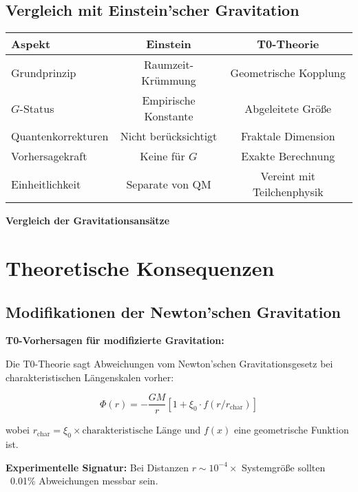 \documentclass[12pt,a4paper]{article}
\begin{document}
	\subsection{Vergleich mit Einstein'scher Gravitation}
	
	\begin{center}
		\begin{tabular}{lcc}
			\toprule
			\textbf{Aspekt} & \textbf{Einstein} & \textbf{T0-Theorie} \\
			\midrule
			Grundprinzip & Raumzeit-Krümmung & Geometrische Kopplung \\
			$G$-Status & Empirische Konstante & Abgeleitete Größe \\
			Quantenkorrekturen & Nicht berücksichtigt & Fraktale Dimension \\
			Vorhersagekraft & Keine für $G$ & Exakte Berechnung \\
			Einheitlichkeit & Separate von QM & Vereint mit Teilchenphysik \\
			\bottomrule
		\end{tabular}
		\par\vspace{0.5em}
		\textbf{Vergleich der Gravitationsansätze}
	\end{center}
	
	\section{Theoretische Konsequenzen}
	
	\subsection{Modifikationen der Newton'schen Gravitation}
	
	\begin{warning}
		\textbf{T0-Vorhersagen für modifizierte Gravitation:}
		
		Die T0-Theorie sagt Abweichungen vom Newton'schen Gravitationsgesetz bei charakteristischen Längenskalen vorher:
		
		\begin{equation}
			\Phi(r) = -\frac{GM}{r} \left[1 + \xi_0 \cdot f(r/r_{\text{char}})\right]
		\end{equation}
		
		wobei $r_{\text{char}} = \xi_0 \times \text{charakteristische Länge}$ und $f(x)$ eine geometrische Funktion ist.
		
		\textbf{Experimentelle Signatur:} Bei Distanzen $r \sim 10^{-4} \times$ Systemgröße sollten ~0.01\% Abweichungen messbar sein.
	\end{warning}
	
\end{document}
